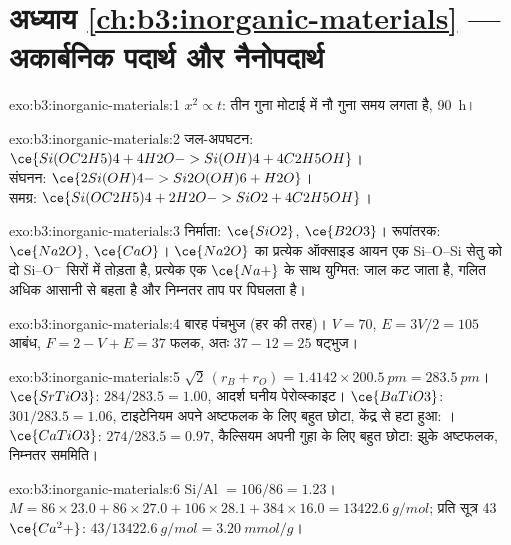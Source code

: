 \section*{अध्याय \ref{ch:b3:inorganic-materials} --- अकार्बनिक पदार्थ और नैनोपदार्थ}

\begin{solution}{exo:b3:inorganic-materials:1}
$x^2 \propto t$: तीन गुना मोटाई में नौ गुना समय लगता है, \qty{90}{h}।
\end{solution}

\begin{solution}{exo:b3:inorganic-materials:2}
जल-अपघटन: $\ce{Si(OC2H5)4 + 4H2O -> Si(OH)4 + 4C2H5OH}$।\\
संघनन: $\ce{2Si(OH)4 -> Si2O(OH)6 + H2O}$।\\
समग्र: $\ce{Si(OC2H5)4 + 2H2O -> SiO2 + 4C2H5OH}$।
\end{solution}

\begin{solution}{exo:b3:inorganic-materials:3}
निर्माता: $\ce{SiO2}$, $\ce{B2O3}$। रूपांतरक: $\ce{Na2O}$, $\ce{CaO}$। $\ce{Na2O}$ का प्रत्येक ऑक्साइड आयन एक Si--O--Si
सेतु को दो Si--O$^-$ सिरों में तोड़ता है, प्रत्येक एक $\ce{Na+}$ के साथ युग्मित: जाल कट जाता है, गलित
अधिक आसानी से बहता है और निम्नतर ताप पर पिघलता है।
\end{solution}

\begin{solution}{exo:b3:inorganic-materials:4}
बारह पंचभुज (हर  की तरह)। $V = 70$, $E = 3V/2 = 105$ आबंध, $F = 2 - V + E = 37$
फलक, अतः $37 - 12 = 25$ षट्भुज।
\end{solution}

\begin{solution}{exo:b3:inorganic-materials:5}
$\sqrt2\,(r_B + r_O) = 1.4142 \times \qty{200.5}{pm} = \qty{283.5}{pm}$। $\ce{SrTiO3}$: $284/283.5 = 1.00$, आदर्श घनीय पेरोव्स्काइट।
$\ce{BaTiO3}$: $301/283.5 = 1.06$, टाइटेनियम अपने अष्टफलक के लिए बहुत छोटा, केंद्र से हटा हुआ: ।
$\ce{CaTiO3}$: $274/283.5 = 0.97$, कैल्सियम अपनी गुहा के लिए बहुत छोटा: झुके अष्टफलक, निम्नतर
सममिति।
\end{solution}

\begin{solution}{exo:b3:inorganic-materials:6}
Si/Al $= 106/86 = 1.23$। $M = 86 \times 23.0 + 86 \times 27.0 + 106 \times 28.1 + 384 \times 16.0 = \qty{13422.6}{g/mol}$; प्रति सूत्र 43 $\ce{Ca^2+}$:
$43/\qty{13422.6}{g/mol} = \qty{3.20}{mmol/g}$।
\end{solution}

